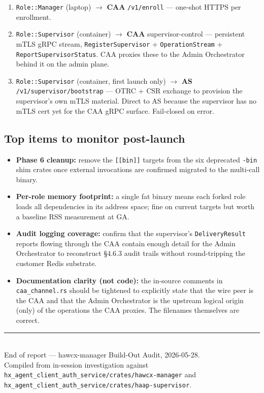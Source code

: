 \documentclass[11pt, a4paper]{article}
\newcommand{\code}[1]{\texttt{\small #1}}
\newcommand{\filepath}[1]{\textcolor{accentpurple}{\texttt{\small #1}}}
\begin{document}
\begin{enumerate}
  \item \code{Role::Manager} (laptop) $\rightarrow$ \textbf{CAA}
        \code{/v1/enroll} --- one-shot HTTPS per enrollment.
  \item \code{Role::Supervisor} (container) $\rightarrow$ \textbf{CAA}
        supervisor-control --- persistent mTLS gRPC stream,
        \code{RegisterSupervisor} + \code{OperationStream} +
        \code{ReportSupervisorStatus}. CAA proxies these to the Admin
        Orchestrator behind it on the admin plane.
  \item \code{Role::Supervisor} (container, first launch only) $\rightarrow$
        \textbf{AS} \code{/v1/supervisor/bootstrap} --- OTRC + CSR
        exchange to provision the supervisor's own mTLS material.
        Direct to AS because the supervisor has no mTLS cert yet for
        the CAA gRPC surface. Fail-closed on error.
\end{enumerate}

\subsection{Top items to monitor post-launch}

\begin{itemize}
  \item \textbf{Phase 6 cleanup:} remove the \code{[[bin]]} targets from
        the six deprecated \code{*-bin} shim crates once external
        invocations are confirmed migrated to the multi-call binary.
  \item \textbf{Per-role memory footprint:} a single fat binary means each
        forked role loads all dependencies in its address space; fine on
        current targets but worth a baseline RSS measurement at GA.
  \item \textbf{Audit logging coverage:} confirm that the supervisor's
        \code{DeliveryResult} reports flowing through the CAA contain
        enough detail for the Admin Orchestrator to reconstruct §4.6.3
        audit trails without round-tripping the customer Redis substrate.
  \item \textbf{Documentation clarity (not code):} the in-source comments
        in \code{caa\_channel.rs} should be tightened to explicitly state
        that the wire peer is the CAA and that the Admin Orchestrator is
        the upstream logical origin (only) of the operations the CAA
        proxies. The filenames themselves are correct.
\end{itemize}

\vfill
\begin{center}
{\color{hawcxborder}\rule{12cm}{0.4pt}}\\[0.2cm]
\sffamily\footnotesize\color{hawcxmuted}
End of report --- hawcx-manager Build-Out Audit, 2026-05-28.\\
Compiled from in-session investigation against
\filepath{hx\_agent\_client\_auth\_service/crates/hawcx-manager} and
\filepath{hx\_agent\_client\_auth\_service/crates/haap-supervisor}.
\end{center}
\end{document}
